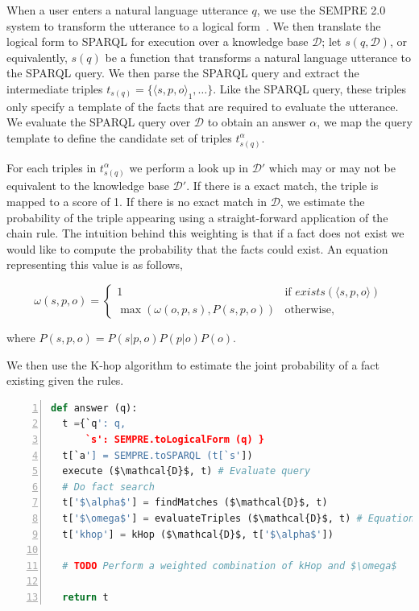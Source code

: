 When a user enters a natural language utterance \(q\), we use the SEMPRE 2.0 system to transform the utterance to a logical form~\cite{berant2013freebase,berant2013semantic}.
We then translate the logical form to SPARQL for execution over a knowledge base \(\mathcal{D}\);
let \(s(q,\mathcal{D})\), or equivalently, \(s(q)\) be a function that transforms a natural language utterance to the SPARQL query.
We then parse the SPARQL query and extract the intermediate triples \( t_{s(q)} = \{\langle s,p,o\rangle_1, \ldots \}\). 
Like the SPARQL query, these triples only specify a template of the facts that are required to evaluate the utterance.
We evaluate the SPARQL query over \(\mathcal{D}\) to obtain an answer \( \alpha \), we map the query template to define the candidate set of triples \( t^\alpha_{s(q)} \).

For each triples in \( t^\alpha_{s(q)} \) we perform a look up in \(\mathcal{D'}\) which may or may not be equivalent to the knowledge base \(\mathcal{D'}\).
If there is a exact match, the triple is mapped to a score of 1.
If there is no exact match in \(\mathcal{D}\), we estimate the probability of the triple appearing using a straight-forward application of the chain rule.
The intuition behind this weighting is that if a fact does not exist we would like to compute the probability that the facts could exist.
An equation representing this value is as follows,

\begin{equation}
  \label{eq:probqa-weight}
  \omega(s,p,o) = \begin{cases}
    1 & \mbox{if } exists(\langle s,p,o \rangle) \\ 
    \max( \omega(o,p,s), P(s,p,o)) & \mbox{otherwise,}
  \end{cases}
\end{equation}

where \( P(s,p,o) = P(s|p,o)  P(p|o)  P(o) \).

We then use the K-hop algorithm to estimate the joint probability of a fact existing given the rules.


\begin{lstlisting}[language=Python,basicstyle=\small,showstringspaces=false,mathescape=true,frame=single,numbers=left,label=probqa-algo,caption={Algorithm for obtaining the information}]
def answer (q):
  t ={`q': q,
      `s': SEMPRE.toLogicalForm (q) }
  t[`a'] = SEMPRE.toSPARQL (t[`s'])
  execute ($\mathcal{D}$, t) # Evaluate query
  # Do fact search
  t['$\alpha$'] = findMatches ($\mathcal{D}$, t) 
  t['$\omega$'] = evaluateTriples ($\mathcal{D}$, t) # Equation~\ref{eq:probqa-weight}
  t['khop'] = kHop ($\mathcal{D}$, t['$\alpha$'])

  # TODO Perform a weighted combination of kHop and $\omega$

  return t

\end{lstlisting}


